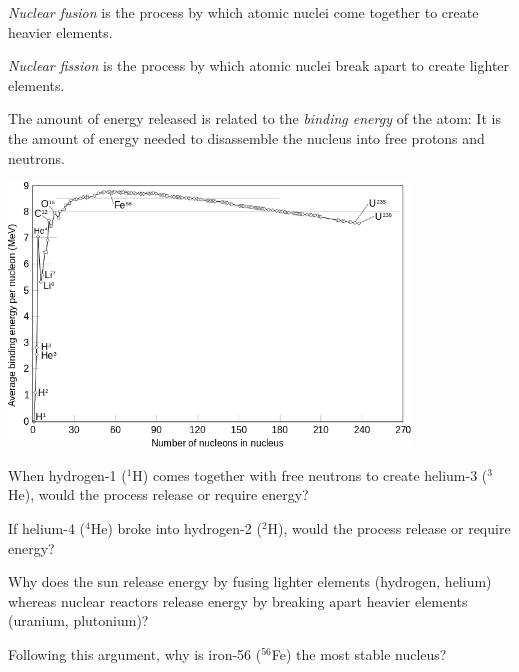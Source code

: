 \documentclass[12pt]{exam}
\begin{document}
\begin{questions}
	
	\clearpage
	\question \textit{Nuclear fusion} is the process by which atomic nuclei come together to create heavier elements.
	
	\textit{Nuclear fission} is the process by which atomic nuclei break apart to create lighter elements.
	
	The amount of energy released is related to the \textit{binding energy} of the atom: It is the amount of energy needed to disassemble the nucleus into free protons and neutrons.
	\begin{center}
		\includegraphics[width=0.8\textwidth]{../images/bindingEnergies.png}
	\end{center}
	
	\begin{parts}
		\item When hydrogen-1 ($^1$H) comes together with free neutrons to create helium-3 ($^3$He), would the process release or require energy?
			\vspace{0.5in}
		\item If helium-4 ($^4$He) broke into hydrogen-2 ($^2$H), would the process release or require energy?
			\vspace{0.5in}
		\item Why does the sun release energy by fusing lighter elements (hydrogen, helium) whereas nuclear reactors release energy by breaking apart heavier elements (uranium, plutonium)?
			\vspace{0.5in}
		\item Following this argument, why is iron-56 ($^{56}$Fe) the most stable nucleus?
			\vspace{0.5in}
	\end{parts}
\end{questions}
\end{document}
